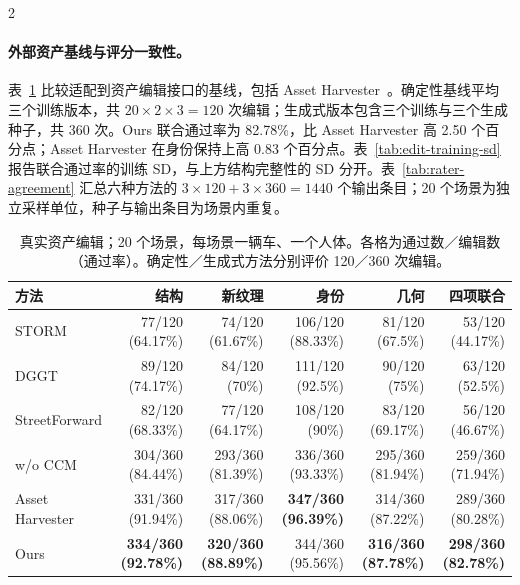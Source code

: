 \begin{multicols}{2}

\paragraph{外部资产基线与评分一致性。}
表~\ref{tab:real-edit-baselines} 比较适配到资产编辑接口的基线，包括 Asset Harvester~\cite{cao2026assetharvester}。确定性基线平均三个训练版本，共 $20\times2\times3=120$ 次编辑；生成式版本包含三个训练与三个生成种子，共 360 次。Ours 联合通过率为 82.78\%，比 Asset Harvester 高 2.50 个百分点；Asset Harvester 在身份保持上高 0.83 个百分点。表~\ref{tab:edit-training-sd} 报告联合通过率的训练 SD，与上方结构完整性的 SD 分开。表~\ref{tab:rater-agreement} 汇总六种方法的 $3\times120+3\times360=1440$ 个输出条目；20 个场景为独立采样单位，种子与输出条目为场景内重复。

\end{multicols}
\begin{table}[H]
\centering\small
\setlength{\tabcolsep}{3pt}
\caption{真实资产编辑；20 个场景，每场景一辆车、一个人体。各格为通过数／编辑数（通过率）。确定性／生成式方法分别评价 120／360 次编辑。}
\label{tab:real-edit-baselines}
\begin{tabular}{@{}lrrrrr@{}}
\toprule
方法 & 结构 & 新纹理 & 身份 & 几何 & 四项联合 \\
\midrule
STORM & 77/120 (64.17\%) & 74/120 (61.67\%) & 106/120 (88.33\%) & 81/120 (67.5\%) & 53/120 (44.17\%) \\
DGGT & 89/120 (74.17\%) & 84/120 (70\%) & 111/120 (92.5\%) & 90/120 (75\%) & 63/120 (52.5\%) \\
StreetForward & 82/120 (68.33\%) & 77/120 (64.17\%) & 108/120 (90\%) & 83/120 (69.17\%) & 56/120 (46.67\%) \\
w/o CCM & 304/360 (84.44\%) & 293/360 (81.39\%) & 336/360 (93.33\%) & 295/360 (81.94\%) & 259/360 (71.94\%) \\
Asset Harvester & 331/360 (91.94\%) & 317/360 (88.06\%) & \textbf{347/360 (96.39\%)} & 314/360 (87.22\%) & 289/360 (80.28\%) \\
Ours & \textbf{334/360 (92.78\%)} & \textbf{320/360 (88.89\%)} & 344/360 (95.56\%) & \textbf{316/360 (87.78\%)} & \textbf{298/360 (82.78\%)} \\
\bottomrule
\end{tabular}
\end{table}


